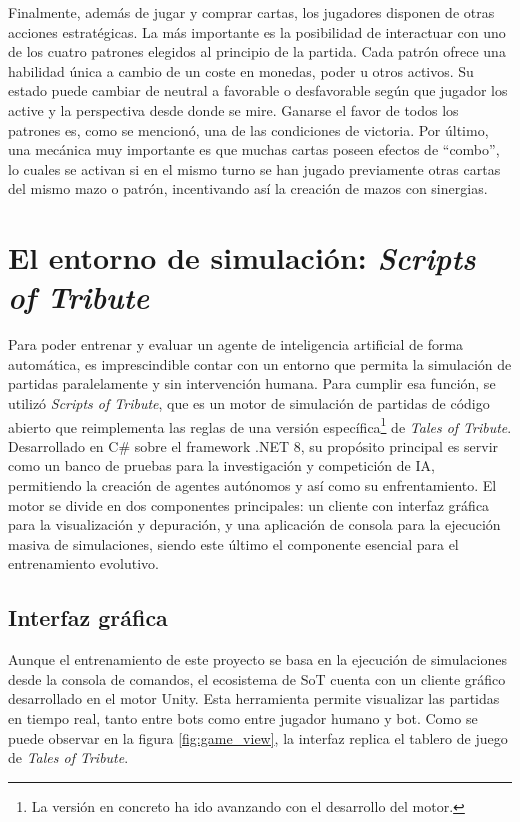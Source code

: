 Finalmente, además de jugar y comprar cartas, los jugadores disponen de otras acciones estratégicas. La más importante es la posibilidad de interactuar con uno de los cuatro patrones elegidos al principio de la partida. Cada patrón ofrece una habilidad única a cambio de un coste en monedas, poder u otros activos. Su estado puede cambiar de neutral a favorable o desfavorable según que jugador los active y la perspectiva desde donde se mire. Ganarse el favor de todos los patrones es, como se mencionó, una de las condiciones de victoria. Por último, una mecánica muy importante es que muchas cartas poseen efectos de ``combo'', lo cuales se activan si en el mismo turno se han jugado previamente otras cartas del mismo mazo o patrón, incentivando así la creación de mazos con sinergias.

\section{El entorno de simulación: \textit{Scripts of Tribute}} \label{sec:scripts_of_tribute}

Para poder entrenar y evaluar un agente de inteligencia artificial de forma automática, es imprescindible contar con un entorno que permita la simulación de partidas paralelamente y sin intervención humana. Para cumplir esa función, se utilizó \textit{Scripts of Tribute}, que es un motor de simulación de partidas de código abierto que reimplementa las reglas de una versión específica\footnote{La versión en concreto ha ido avanzando con el desarrollo del motor.} de \textit{Tales of Tribute}. Desarrollado en C\# sobre el framework .NET 8, su propósito principal es servir como un banco de pruebas para la investigación y competición de IA, permitiendo la creación de agentes autónomos y así como su enfrentamiento. El motor se divide en dos componentes principales: un cliente con interfaz gráfica para la visualización y depuración, y una aplicación de consola para la ejecución masiva de simulaciones, siendo este último el componente esencial para el entrenamiento evolutivo.

\subsection{Interfaz gráfica} \label{sec:gui_scripts_of_tribute}

Aunque el entrenamiento de este proyecto se basa en la ejecución de simulaciones desde la consola de comandos, el ecosistema de SoT cuenta con un cliente gráfico desarrollado en el motor Unity. Esta herramienta permite visualizar las partidas en tiempo real, tanto entre bots como entre jugador humano y bot. Como se puede observar en la figura \ref{fig:game_view}, la interfaz replica el tablero de juego de \textit{Tales of Tribute}.

